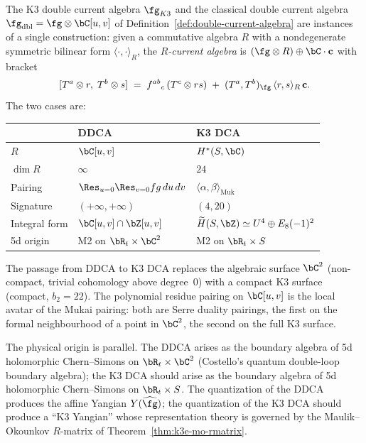 \begin{remark}
\label{rem:k3-dca-vs-ddca}
The K3 double current algebra $\fg_{K3}$ and the classical double
current algebra $\fg_{\mathrm{dbl}} = \fg \otimes \bC[u,v]$ of
Definition~\ref{def:double-current-algebra} are instances of a
single construction: given a commutative algebra $R$ with a
nondegenerate symmetric bilinear form $\langle\cdot,\cdot\rangle_R$,
the \emph{$R$-current algebra} is $(\fg \otimes R) \oplus \bC \cdot \mathbf{c}$
with bracket
\[
 [T^a \otimes r,\; T^b \otimes s]
 \;=\;
 f^{ab}{}_{c}\,(T^c \otimes rs)
 \;+\;
 (T^a, T^b)_{\fg}\,\langle r, s \rangle_R \, \mathbf{c}.
\]
The two cases are:
\begin{center}
\renewcommand{\arraystretch}{1.3}
\begin{tabular}{lll}
 \toprule
 & \textbf{DDCA} & \textbf{K3 DCA} \\
 \midrule
 $R$ & $\bC[u,v]$ & $H^*(S, \bC)$ \\
 $\dim R$ & $\infty$ & $24$ \\
 Pairing & $\Res_{u=0}\Res_{v=0} fg\,du\,dv$ & $\langle \alpha, \beta \rangle_{\mathrm{Muk}}$ \\
 Signature & $(+\infty, +\infty)$ & $(4, 20)$ \\
 Integral form & $\bC[u,v] \cap \bZ[u,v]$ & $\widetilde{H}(S, \bZ) \simeq U^4 \oplus E_8(-1)^2$ \\
 5d origin & M2 on $\bR_t \times \bC^2$ & M2 on $\bR_t \times S$ \\
 \bottomrule
\end{tabular}
\end{center}
The passage from DDCA to K3 DCA replaces the algebraic surface
$\bC^2$ (non-compact, trivial cohomology above degree~$0$) with
a compact K3 surface (compact, $b_2 = 22$).
The polynomial residue pairing on $\bC[u,v]$ is the local avatar
of the Mukai pairing: both are Serre duality pairings, the first
on the formal neighbourhood of a point in $\bC^2$, the second
on the full K3 surface.

The physical origin is parallel. The DDCA arises as the boundary
algebra of 5d holomorphic Chern--Simons on $\bR_t \times \bC^2$
(Costello's quantum double-loop boundary algebra); the K3 DCA
should arise as the boundary algebra of 5d holomorphic Chern--Simons
on $\bR_t \times S$. The quantization of the DDCA produces the
affine Yangian $Y(\widehat{\fg})$; the quantization of the K3 DCA
should produce a ``K3 Yangian'' whose representation theory is
governed by the Maulik--Okounkov $R$-matrix of
Theorem~\ref{thm:k3e-mo-rmatrix}.
\end{remark}

